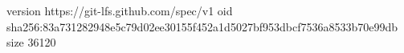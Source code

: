 version https://git-lfs.github.com/spec/v1
oid sha256:83a731282948e5c79d02ee30155f452a1d5027bf953dbcf7536a8533b70e99db
size 36120
